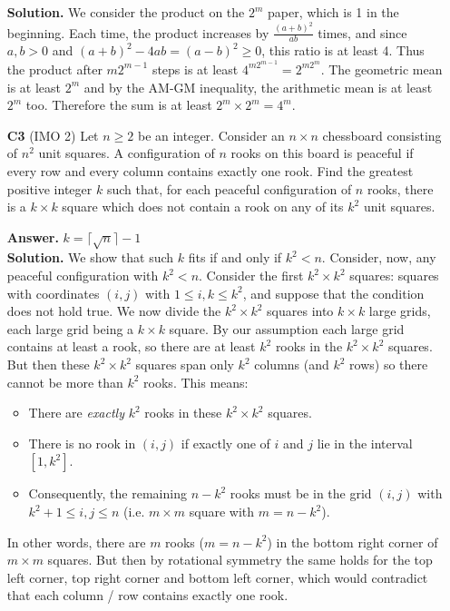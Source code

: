 \documentclass[11pt,a4paper]{article}
\begin{document}
\begin{enumerate}
	\textbf{Solution.} We consider the product on the $2^m$ paper, which is 1 in the beginning. Each time, the product increases by $\frac{(a+b)^2}{ab}$ times, and since $a, b > 0$ and $(a+b)^2-4ab=(a-b)^2\ge 0$, this ratio is at least 4. Thus the product after $m2^{m-1}$ steps is at least $4^{m2^{m-1}}=2^{m2^m}.$ The geometric mean is at least $2^m$ and by the AM-GM inequality, the arithmetic mean is at least $2^m$ too. Therefore the sum is at least $2^m\times 2^m=4^m$. 
	
	\item[\textbf{C3}] (IMO 2)
	Let $n \ge 2$ be an integer. Consider an $n \times n$ chessboard consisting of $n^2$ unit squares. A configuration of $n$ rooks on this board is peaceful if every row and every column contains exactly one rook. Find the greatest positive integer $k$ such that, for each peaceful configuration of $n$ rooks, there is a $k \times k$ square which does not contain a rook on any of its $k^2$ unit squares.
	
	\textbf{Answer.} $k=\lceil\sqrt{n}\rceil -1$\\
	\textbf{Solution.} We show that such $k$ fits if and only if $k^2<n$. 
	Consider, now, any peaceful configuration with $k^2<n$. Consider the first $k^2\times k^2$ squares: squares with coordinates $(i, j)$ with $1\le i, k\le k^2$, and suppose that the condition does not hold true. We now divide the $k^2\times k^2$ squares into $k\times k$ large grids, each large grid being a $k\times k$ square. By our assumption each large grid contains at least a rook, so there are at least $k^2$ rooks in the $k^2\times k^2$ squares. 
	But then these $k^2\times k^2$ squares span only $k^2$ columns (and $k^2$ rows) so there cannot be more than $k^2$ rooks. This means: 
	\begin{itemize}
		\item There are \emph{exactly} $k^2$ rooks in these $k^2\times k^2$ squares. 
		
		\item There is no rook in $(i, j)$ if exactly one of $i$ and $j$ lie in the interval $[1, k^2]$. 
		
		\item Consequently, the remaining $n-k^2$ rooks must be in the grid $(i, j)$ with $k^2+1\le i, j\le n$ (i.e. $m\times m$ square with $m=n-k^2$). 
	\end{itemize}
	In other words, there are $m$ rooks ($m=n-k^2$) in the bottom right corner of $m\times m$ squares. But then by rotational symmetry the same holds for the top left corner, top right corner and bottom left corner, which would contradict that each column / row contains exactly one rook. 
	

\end{enumerate}
\end{document}
